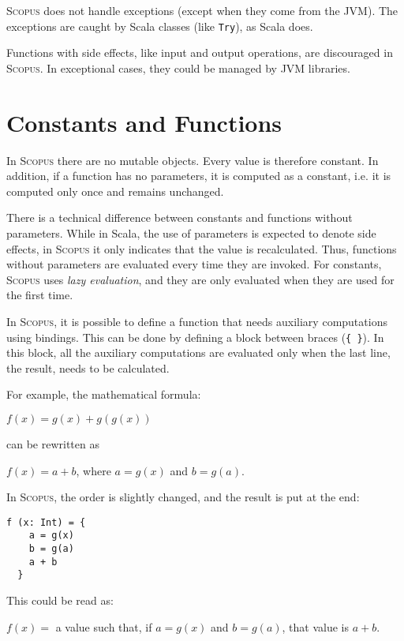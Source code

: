 \documentclass[12pt,a4paper]{book}
\newcommand{\srccode}[1]{\texttt{{#1}}}
\newcommand{\Scopus}{\textsc{Scopus}\xspace}
\begin{document}
    \Scopus does not handle exceptions (except when they come from the JVM).
    The exceptions are caught by Scala classes (like \srccode{Try}), as Scala does.

    Functions with side effects, like input and output operations, are discouraged in \Scopus.
    In exceptional cases, they could be managed by JVM libraries.


    \section{Constants and Functions}

    In \Scopus there are no mutable objects.
    Every value is therefore constant.
    In addition, if a function has no parameters, it is computed as a constant, i.e. it is computed only once and remains unchanged.

    There is a technical difference between constants and functions without parameters.
    While in Scala, the use of parameters is expected to denote side effects, in \Scopus it only indicates that the value is recalculated.
    Thus, functions without parameters are evaluated every time they are invoked.
    For constants, \Scopus uses \textit{lazy evaluation}, and they are only evaluated when they are used for the first time.

    In \Scopus, it is possible to define a function that needs auxiliary computations using bindings.
    This can be done by defining a block between braces (\srccode{\{ \}}).
    In this block, all the auxiliary computations are evaluated only when the last line, the result, needs to be calculated.

    For example, the mathematical formula:
    \begin{center}
        $f(x) = g(x) + g(g(x))$
    \end{center}
    can be rewritten as
    \begin{center}
        $f(x) = a + b$, where $a = g(x)$ and $b = g(a)$.
    \end{center}

    In \Scopus, the order is slightly changed, and the result is put at the end:
    \begin{lstlisting}[label={lst:exampleFunctionWithBraces}]
  f (x: Int) = {
    a = g(x)
    b = g(a)
    a + b
  }
    \end{lstlisting}

    This could be read as:
    \begin{center}
        $f(x) = $ a value such that, if $a = g(x)$ and $b = g(a)$, that value is $a + b$.
    \end{center}
\end{document}
